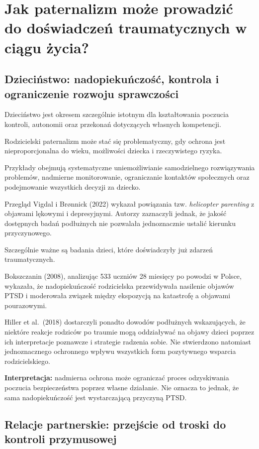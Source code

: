 \documentclass[11pt,a4paper,oneside,headinclude=true,footinclude=false]{scrartcl}
\begin{document}
\section{Jak paternalizm może prowadzić do doświadczeń traumatycznych w ciągu życia?}\label{sec:4}

\subsection{Dzieciństwo: nadopiekuńczość, kontrola i ograniczenie rozwoju sprawczości}\label{subsec:4.1}

Dzieciństwo jest okresem szczególnie istotnym dla kształtowania poczucia
kontroli, autonomii oraz przekonań dotyczących własnych kompetencji.

Rodzicielski paternalizm może stać się problematyczny, gdy ochrona jest
nieproporcjonalna do wieku, możliwości dziecka i rzeczywistego ryzyka.

Przykłady obejmują systematyczne uniemożliwianie samodzielnego
rozwiązywania problemów, nadmierne monitorowanie, ograniczanie kontaktów
społecznych oraz podejmowanie wszystkich decyzji za dziecko.

Przegląd Vigdal i Brønnick (2022) wykazał powiązania tzw.
\emph{helicopter parenting} z objawami lękowymi i depresyjnymi. Autorzy
zaznaczyli jednak, że jakość dostępnych badań podłużnych nie pozwalała
jednoznacznie ustalić kierunku przyczynowego.

Szczególnie ważne są badania dzieci, które doświadczyły już zdarzeń
traumatycznych.

Bokszczanin (2008), analizując 533 uczniów 28 miesięcy po powodzi w
Polsce, wykazała, że nadopiekuńczość rodzicielska przewidywała nasilenie
objawów PTSD i moderowała związek między ekspozycją na katastrofę a
objawami pourazowymi.

Hiller et al.~(2018) dostarczyli ponadto dowodów podłużnych
wskazujących, że niektóre reakcje rodziców po traumie mogą oddziaływać
na objawy dzieci poprzez ich interpretacje poznawcze i strategie
radzenia sobie. Nie stwierdzono natomiast jednoznacznego ochronnego
wpływu wszystkich form pozytywnego wsparcia rodzicielskiego.

\textbf{Interpretacja:} nadmierna ochrona może ograniczać proces
odzyskiwania poczucia bezpieczeństwa poprzez własne działanie. Nie
oznacza to jednak, że sama nadopiekuńczość jest wystarczającą przyczyną
PTSD.

\subsection{Relacje partnerskie: przejście od troski do kontroli przymusowej}\label{subsec:4.2}
\end{document}
